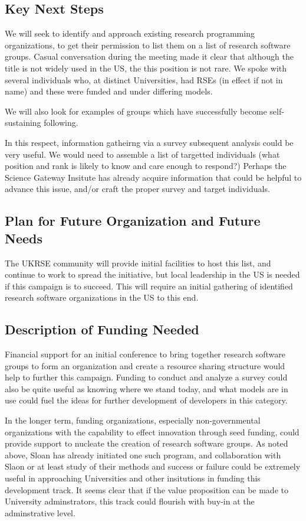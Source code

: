 \subsection{Key Next Steps}

We will seek to identify and approach existing research programming organizations,
to get their permission to list them on a list of research software groups.
Casual conversation during the meeting made it clear that although the title is not
widely used in the US, the this position is not rare. We spoke with several individuals
who, at distinct Universities, had RSEs (in effect if not in name) and these were funded
and under differing models. 

We will also look for examples of groups which have successfully become self-
sustaining following. 

In this respect, information gatheirng via a survey subsequent analysis could be very useful.
We would need to assemble a list of targetted individuals (what position and rank is
likely to know and care enough to respond?) Perhaps the Science Gateway Insitute has already acquire
information that could be helpful to advance this issue, and/or craft the proper survey and target
individuals. 

\subsection{Plan for Future Organization and Future Needs}

The UKRSE community will provide initial facilities to host this list, and
continue to work to spread the initiative, but local leadership in the US
is needed if this campaign is to succeed. This will require an initial gathering
of identified research software organizations in the US to this end.

\subsection{Description of Funding Needed}

Financial support for an initial conference to bring together research software
groups to form an organization and create a resource sharing structure would
help to further this campaign. Funding to conduct and analyze a survey could also be quite useful
as knowing where we stand today, and what models are in use could fuel the ideas for further
development of developers in this category.

In the longer term, funding organizations, especially non-governmental organizations
with the capability to effect innovation through seed funding, could provide
support to nucleate the creation of research software groups. As noted above, Sloan has already
initiated one such program, and collaboration with Slaon or at least study of their methods and 
success or failure could be extremely useful in approaching Universities and other insitutions 
in funding this development track. It seems clear that if the value proposition can be made to
University adminstrators, this track could flourish with buy-in at the adminstrative level.  

